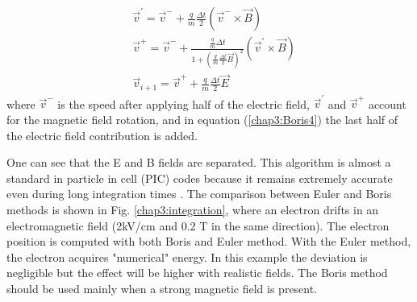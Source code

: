 \begin{refsection}
\begin{align}
     & \vec{v}^{'} = \vec{v}^{-} + \frac{q}{m} \frac{\Delta t}{2}(\vec{v}^{-} \times \vec{B})                                            \\
     & \vec{v}^{+} = \vec{v}^{-} + \frac{\frac{q}{m}\Delta t}{1+(\frac{q}{m} \frac{\Delta t}{2}\vec{B})^{2}}(\vec{v}^{'} \times \vec{B}) \\
     & \vec{v}_{i+1} = \vec{v}^{+} + \frac{q}{m} \frac{\Delta t}{2}\vec{E} \label{chap3:Boris4}
  \end{align}
  where $\vec{v}^{-}$ is the speed after applying half of the electric field, $\vec{v}^{'}$ and $\vec{v}^{+}$ account for the magnetic field rotation, and in equation (\ref{chap3:Boris4}) the last half of the electric field contribution is added.

  One can see that the E and B fields are separated. This algorithm is almost a standard in particle in cell (PIC) codes because it remains extremely accurate even during long integration times \cite{Qin2013}. The comparison between Euler and Boris methods is shown in Fig. \ref{chap3:integration}, where an electron drifts in an electromagnetic field (2kV/cm and 0.2 T in the same direction). The electron position is computed with both Boris and Euler method. With the Euler method, the electron acquires "numerical" energy. In this example the deviation is negligible but the effect will be higher with realistic fields. The Boris method should be used mainly when a strong magnetic field is present.


\end{refsection}
